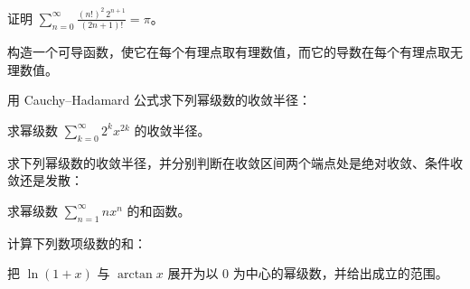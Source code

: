 \noindent\begin{minipage}{\textwidth}
证明 $\displaystyle\sum_{n=0}^{\infty}\frac{(n!)^2\,2^{n+1}}{(2n+1)!}=\pi$。
\end{minipage}\par\vfill
\noindent\begin{minipage}{\textwidth}
构造一个可导函数，使它在每个有理点取有理数值，而它的导数在每个有理点取无理数值。
\end{minipage}\par\vfill
\newpage
\noindent\begin{minipage}{\textwidth}
用 Cauchy--Hadamard 公式求下列幂级数的收敛半径：
\end{minipage}\par\vfill
\noindent\begin{minipage}{\textwidth}
求幂级数 $\sum_{k=0}^{\infty}2^kx^{2k}$ 的收敛半径。
\end{minipage}\par\vfill
\noindent\begin{minipage}{\textwidth}
求下列幂级数的收敛半径，并分别判断在收敛区间两个端点处是绝对收敛、条件收敛还是发散：
\end{minipage}\par\vfill
\newpage
\noindent\begin{minipage}{\textwidth}
求幂级数 $\sum_{n=1}^{\infty}nx^n$ 的和函数。
\end{minipage}\par\vfill
\noindent\begin{minipage}{\textwidth}
计算下列数项级数的和：
\end{minipage}\par\vfill
\noindent\begin{minipage}{\textwidth}
把 $\ln(1+x)$ 与 $\arctan x$ 展开为以 $0$ 为中心的幂级数，并给出成立的范围。
\end{minipage}\par\vfill
